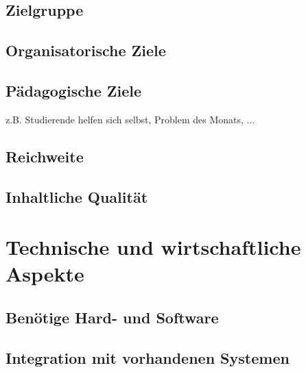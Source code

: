 \subsection{Zielgruppe} %
\label{sub:zielgruppe}


\subsection{Organisatorische Ziele} %
\label{sub:organisatorische_ziele}


\subsection{Pädagogische Ziele} %
\label{sub:padagogische_ziele}
z.B. Studierende helfen sich selbst, Problem des Monats, ...

\subsection{Reichweite} %
\label{sub:reichweite}


\subsection{Inhaltliche Qualität} %
\label{sub:inhaltliche_qualitat}



\section{Technische und wirtschaftliche Aspekte} %
\label{sec:technische_und_wirtschaftliche_aspekte}

\subsection{Benötige Hard- und Software} %
\label{sub:benotige_hard_und_software}


\subsection{Integration mit vorhandenen Systemen} %
\label{sub:integration_mit_vorhandenen_systemen}

